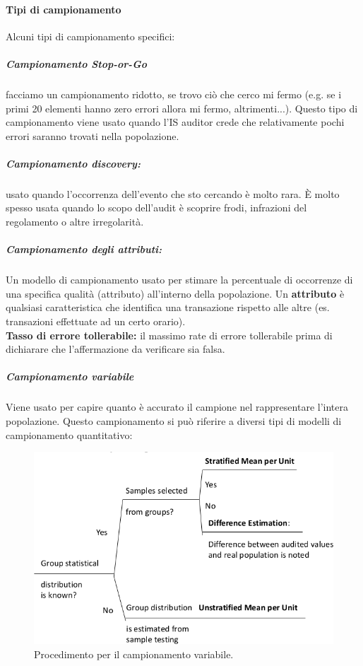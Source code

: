 

\paragraph{Tipi di campionamento} Alcuni tipi di campionamento specifici:

\subparagraph*{Campionamento Stop-or-Go}
facciamo un campionamento ridotto, se trovo
ciò che cerco mi fermo (e.g. se i primi 20 elementi hanno zero errori allora mi
fermo, altrimenti...). Questo tipo di campionamento viene usato quando l'IS
auditor crede che relativamente pochi errori saranno trovati nella popolazione.

\subparagraph*{Campionamento discovery:} usato quando
l'occorrenza dell'evento che sto cercando è molto rara.
È molto spesso usata quando lo scopo dell'audit è scoprire frodi,
infrazioni del regolamento o altre irregolarità.

\subparagraph*{Campionamento degli attributi:}
Un modello di campionamento usato per stimare la percentuale di
occorrenze di una specifica qualità (attributo) all'interno della
popolazione. Un \textbf{attributo} è qualsiasi
caratteristica che identifica una transazione rispetto alle altre (es.
transazioni effettuate ad un certo orario).\\
\textbf{Tasso di errore tollerabile:} il massimo rate di errore
tollerabile prima di dichiarare che l'affermazione da verificare
sia falsa.\\


\subparagraph*{Campionamento variabile}
Viene usato per capire quanto è accurato il campione nel rappresentare
l'intera popolazione. Questo campionamento si può riferire
a diversi tipi di modelli di campionamento quantitativo:

\begin{figure}[h!]
  \begin{center}
    \includegraphics[scale=0.5]{res/img/variable_sampling.png}
  \end{center}
  \caption{Procedimento per il campionamento variabile.}
  \label{fig:variable:sampling}
\end{figure}

